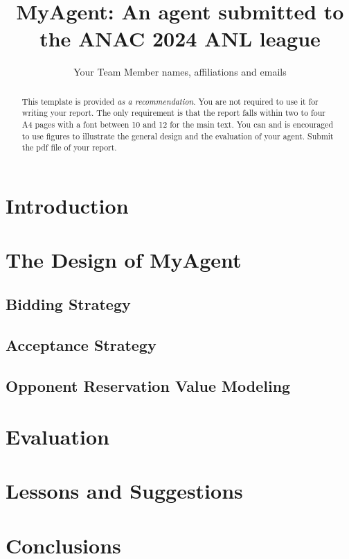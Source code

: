 \documentclass{article}
\title{MyAgent: An agent submitted to the ANAC 2024 ANL league}
\author{Your Team Member names, affiliations and emails}
\begin{document}
\maketitle
\begin{abstract}
	This template is provided \emph{as a recommendation}. You are not required
	to use it for writing your report. The only requirement is that the report
	falls within two to four A4 pages with a font between 10 and 12 for the main
	text. You can and is encouraged to use figures to illustrate the general
	design and the evaluation of your agent. Submit the pdf file of your report.
\end{abstract}
\section{Introduction}
\section{The Design of MyAgent}
\subsection{Bidding Strategy}
\subsection{Acceptance Strategy}
\subsection{Opponent Reservation Value Modeling}
\section{Evaluation}
\section{Lessons and Suggestions}
\section*{Conclusions}
\end{document}
